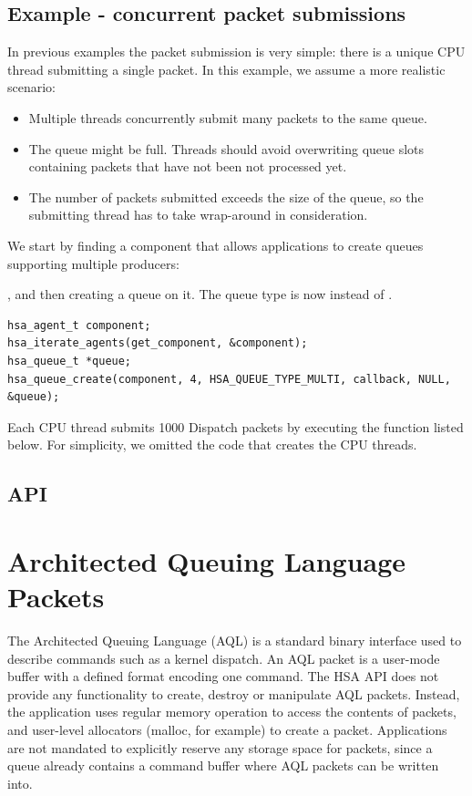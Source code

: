 \documentclass[final,oneside]{book}
\begin{document}
\subsection{Example - concurrent packet submissions}
In previous examples the packet submission is very simple: there is a unique CPU
thread submitting a single packet. In this example, we assume a more realistic
scenario:
\begin{itemize}[itemsep=1pt,topsep=3pt,partopsep=0pt]
\item Multiple threads concurrently submit many packets to the same queue.
\item The queue might be full. Threads should avoid overwriting queue slots
  containing packets that have not been not processed yet.
\item The number of packets submitted exceeds the size of the queue, so the
  submitting thread has to take wrap-around in consideration.
\end{itemize}

We start by finding a component that allows applications to create queues
supporting multiple producers:


, and then creating a queue on it. The queue type is now
 instead of .
\begin{lstlisting}
hsa_agent_t component;
hsa_iterate_agents(get_component, &component);
hsa_queue_t *queue;
hsa_queue_create(component, 4, HSA_QUEUE_TYPE_MULTI, callback, NULL, &queue);
\end{lstlisting}
Each CPU thread submits 1000 Dispatch packets by executing the function listed
below. For simplicity, we omitted the code that creates the CPU threads.




\subsection{API}


\section{Architected Queuing Language Packets}\label{sec:aql}
The Architected Queuing Language (AQL) is a standard binary interface used to
describe commands such as a kernel dispatch. An AQL packet is a user-mode buffer
with a defined format encoding one command. The HSA API does not provide any
functionality to create, destroy or manipulate AQL packets. Instead, the
application uses regular memory operation to access the contents of packets, and
user-level allocators (malloc, for example) to create a packet. Applications are
not mandated to explicitly reserve any storage space for packets, since a queue
already contains a command buffer where AQL packets can be written into.
\end{document}
